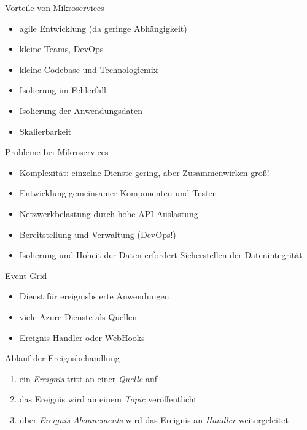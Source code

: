 \begin{flashcard}[]{Vorteile von Mikroservices}
  \begin{itemize}
    \item agile Entwicklung (da geringe Abhängigkeit)
    \item kleine Teams, DevOps
    \item kleine Codebase und Technologiemix
    \item Isolierung im Fehlerfall
    \item Isolierung der Anwendungsdaten
    \item Skalierbarkeit
  \end{itemize}
\end{flashcard}

\begin{flashcard}[]{Probleme bei Mikroservices}
  \begin{itemize}
    \item Komplexität: einzelne Dienste gering, aber Zusammenwirken groß!
    \item Entwicklung gemeinsamer Komponenten und Testen
    \item Netzwerkbelastung durch hohe API-Auslastung
    \item Bereitstellung und Verwaltung (DevOps!)
    \item Isolierung und Hoheit der Daten erfordert Sicherstellen der Datenintegrität
  \end{itemize}
\end{flashcard}

\begin{flashcard}[]{Event Grid}
  \begin{itemize}
    \item Dienst für ereignisbsierte Anwendungen
    \item viele Azure-Dienste als Quellen
    \item Ereignis-Handler oder WebHooks
  \end{itemize}
\end{flashcard}

\begin{flashcard}[]{Ablauf der Ereignsbehandlung}
  \begin{enumerate}
    \item ein \emph{Ereignis} tritt an einer \emph{Quelle} auf
    \item das Ereignis wird an einem \emph{Topic} veröffentlicht
    \item über \emph{Ereignis-Abonnements} wird das Ereignis an \emph{Handler} weitergeleitet
  \end{enumerate}
\end{flashcard}

